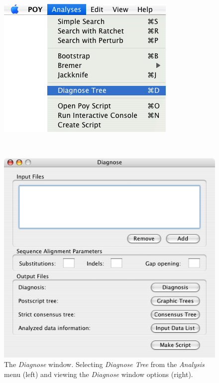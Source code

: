 {\begin{figure}
\centering
\begin{minipage}[c]{0.45\textwidth}
   		\includegraphics[width=\textwidth]{doc/figures/diagnose_menu.jpg}
\end{minipage}
\,
\begin{minipage}[c]{0.52\textwidth}
	   	\includegraphics[width=\textwidth]{doc/figures/diagnose_window.jpg}
   	\end{minipage}
\caption{The \emph{Diagnose} window. Selecting \emph{Diagnose Tree} from the \emph{Analysis} menu (left) and viewing the \emph{Diagnose} window options (right).}
\label{fig:diagnosetree}
\end{figure}

}
